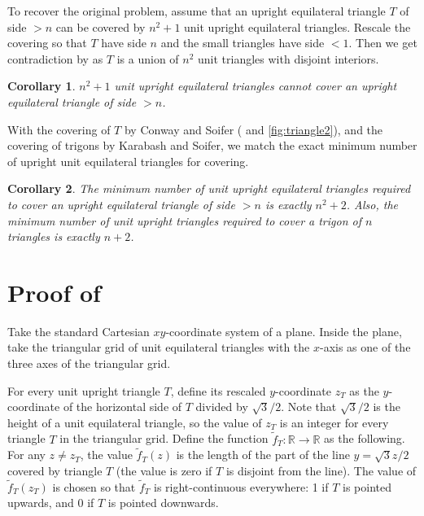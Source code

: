\documentclass[a4paper]{amsart}
\theoremstyle{plain}
\newtheorem{corollary}{Corollary}
\theoremstyle{definition}
\begin{document}
To recover the original problem, assume that an upright equilateral triangle \(T\) of side \(> n\) can be covered by \(n^2 + 1\) unit upright equilateral triangles. Rescale the covering so that \(T\) have side \(n\) and the small triangles have side \(< 1\). Then we get contradiction by  as \(T\) is a union of \(n^2\) unit triangles with disjoint interiors.

\begin{corollary}

\(n^2 + 1\) unit upright equilateral triangles cannot cover an upright equilateral triangle of side \(> n\).

\label{cor:triangle-cover}
\end{corollary}

With the covering of \(T\) by Conway and Soifer ( and \ref{fig:triangle2}), and the covering of trigons by Karabash and Soifer,
we match the exact minimum number of upright unit equilateral triangles for covering.

\begin{corollary}

The minimum number of unit upright equilateral triangles required to cover an upright equilateral triangle of side \(> n\) is exactly \(n^2+2\). Also, the minimum number of unit upright triangles required to cover a trigon of \(n\) triangles is exactly \(n + 2\).

\label{cor:triangle-cover-number}
\end{corollary}

\section{Proof of }

Take the standard Cartesian \(xy\)-coordinate system of a plane. Inside the plane, take the triangular grid of unit equilateral triangles with the \(x\)-axis as one of the three axes of the triangular grid.

For every unit upright triangle \(T\), define its rescaled \(y\)-coordinate \(z_T\) as the \(y\)-coordinate of the horizontal side of $T$ divided by \(\sqrt{3}/2\). Note that \(\sqrt{3}/2\) is the height of a unit equilateral triangle, so the value of \(z_T\) is an integer for every triangle \(T\) in the triangular grid.
Define the function \(\tilde{f}_T : \mathbb{R} \to \mathbb{R}\) as the following. For any \(z \neq z_T\), the value \(\tilde{f}_T(z)\) is the length of the part of the line \(y = \sqrt{3}z / 2\) covered by triangle \(T\) (the value is zero if \(T\) is disjoint from the line). The value of \(\tilde{f}_T(z_T)\) is chosen so that \(\tilde{f}_T\) is right-continuous everywhere: 1 if \(T\) is pointed upwards, and 0 if \(T\) is pointed downwards.
\end{document}
